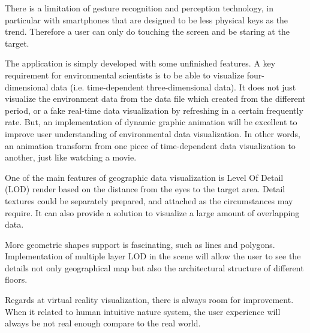 There is a limitation of gesture recognition and perception technology, in particular with smartphones that are designed to be less physical keys as the trend. Therefore a user can only do touching the screen and be staring at the target.

The application is simply developed with some unfinished features. A key requirement for environmental scientists is to be able to visualize four-dimensional data (i.e. time-dependent three-dimensional data). It does not just visualize the environment data from the data file which created from the different period, or a fake real-time data visualization by refreshing in a certain frequently rate. But, an implementation of dynamic graphic animation will be excellent to improve user understanding of environmental data visualization. In other words, an animation transform from one piece of time-dependent data visualization to another, just like watching a movie.

One of the main features of geographic data visualization is Level Of Detail (LOD) render based on the distance from the eyes to the target area. Detail textures could be separately prepared, and attached as the circumstances may require. It can also provide a solution to visualize a large amount of overlapping data.

More geometric shapes support is fascinating, such as lines and polygons. Implementation of multiple layer LOD in the scene will allow the user to see the details not only geographical map but also the architectural structure of different floors.

Regards at virtual reality visualization, there is always room for improvement. When it related to human intuitive nature system, the user experience will always be not real enough compare to the real world.

